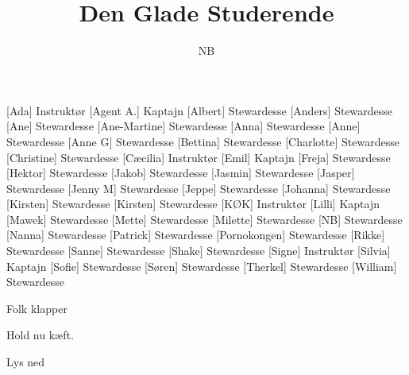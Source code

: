 \documentclass[a4paper,11pt]{article}
\title{Den Glade Studerende}
\author{NB}
\begin{document}
\maketitle

\begin{roles}
[Ada] Instruktør
[Agent A.] Kaptajn
[Albert] Stewardesse
[Anders] Stewardesse
[Ane] Stewardesse
[Ane-Martine] Stewardesse
[Anna] Stewardesse
[Anne] Stewardesse
[Anne G] Stewardesse
[Bettina] Stewardesse
[Charlotte] Stewardesse
[Christine] Stewardesse
[Cæcilia] Instruktør
[Emil] Kaptajn
[Freja] Stewardesse
[Hektor] Stewardesse
[Jakob] Stewardesse
[Jasmin] Stewardesse
[Jasper] Stewardesse
[Jenny M] Stewardesse
[Jeppe] Stewardesse
[Johanna] Stewardesse
[Kirsten] Stewardesse
[Kirsten] Stewardesse
[KØK] Instruktør
[Lilli] Kaptajn
[Mawek] Stewardesse
[Mette] Stewardesse
[Milette] Stewardesse
[NB] Stewardesse
[Nanna] Stewardesse
[Patrick] Stewardesse
[Pornokongen] Stewardesse
[Rikke] Stewardesse
[Sanne] Stewardesse
[Shake] Stewardesse
[Signe] Instruktør
[Silvia] Kaptajn
[Sofie] Stewardesse
[Søren] Stewardesse
[Therkel] Stewardesse
[William] Stewardesse
\end{roles}


\begin{sketch}
\scene Folk klapper

 Hold nu kæft.

\scene Lys ned
\end{sketch}
\end{document}
